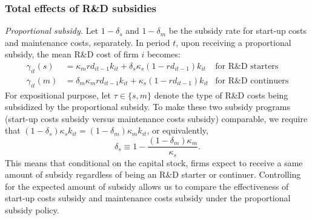 \documentclass[11pt]{article}
\begin{document}
\subsubsection{Total effects of R\&D subsidies}
\textit{Proportional subsidy.} Let $1-\delta_s$ and $1-\delta_m$ be the subsidy rate for start-up costs and maintenance costs, separately. In period $t$, upon receiving a proportional subsidy, the mean R\&D cost of firm $i$ becomes:
\begin{align*}
     \gamma_{it}(s)&=\kappa_mrd_{it-1}k_{it}+\delta_s\kappa_s(1- rd_{it-1}) k_{it} &\text{for R\&D starters}   \\
     \gamma_{it}(m)&=\delta_m\kappa_m rd_{it-1} k_{it}+ \kappa_s(1-rd_{it-1}) k_{it}&\text{for R\&D continuers}
\end{align*}
For expositional purpose, let $\tau\in\{s,m\}$ denote the type of R\&D costs being subsidized by the proportional subsidy. To make these two subsidy programs (start-up costs subsidy versus maintenance costs subsidy) comparable, we require that $(1-\delta_s)\kappa_sk_{it}=(1-\delta_m)\kappa_mk_{it}$, or equivalently, 
\begin{equation}
\delta_s\equiv 1-\frac{(1-\delta_m)\kappa_m}{\kappa_s}.
\end{equation}
This means that conditional on the capital stock, firms expect to receive a same amount of subsidy regardless of being an R\&D starter or continuer. Controlling for the expected amount of subsidy allows us to compare the effectiveness of start-up costs subsidy and maintenance costs subsidy under the proportional subsidy policy. 
\end{document}

